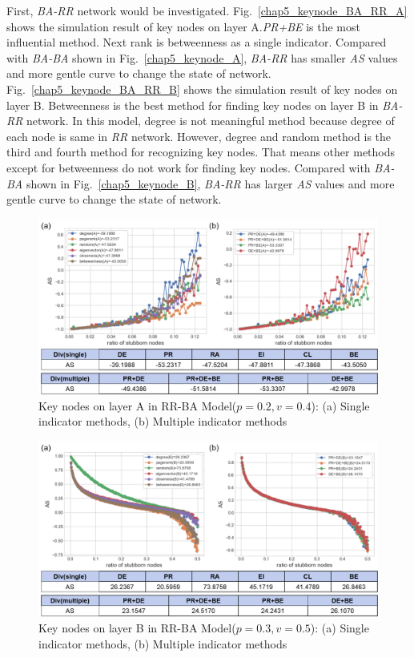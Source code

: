First, \textit{BA-RR} network would be investigated. Fig.~\ref{chap5_keynode_BA_RR_A} shows the simulation result of key nodes on layer A.\textit{PR+BE} is the most influential method. Next rank is betweenness as a single indicator. Compared with \textit{BA-BA} shown in Fig.~\ref{chap5_keynode_A}, \textit{BA-RR} has smaller \textit{AS} values and more gentle curve to change the state of network. \\
Fig.~\ref{chap5_keynode_BA_RR_B} shows the simulation result of key nodes on layer B. Betweenness is the best method for finding key nodes on layer B in \textit{BA-RR} network. In this model, degree is not meaningful method because degree of each node is same in \textit{RR} network. However, degree and random method is the third and fourth method for recognizing key nodes. That means other methods except for betweenness do not work for finding key nodes. Compared with \textit{BA-BA} shown in Fig.~\ref{chap5_keynode_B}, \textit{BA-RR} has larger \textit{AS} values and more gentle curve to change the state of network. 
\begin{figure}[!htb]
	\centering
	\includegraphics[width=\hsize]{figure/chap5_keynode_RR_BA_A.png}
	\caption{Key nodes on layer A in RR-BA Model($p=0.2, v=0.4$):
		(a) Single indicator methods, (b) Multiple indicator methods}
	\label{chap5_keynode_RR_BA_A}
\end{figure}
\begin{figure}[!htb]
	\centering
	\includegraphics[width=\hsize]{figure/chap5_keynode_RR_BA_B.png}
	\caption{Key nodes on layer B in RR-BA Model($p=0.3, v=0.5$):
		(a) Single indicator methods, (b) Multiple indicator methods}
	\label{chap5_keynode_RR_BA_B}
\end{figure}
